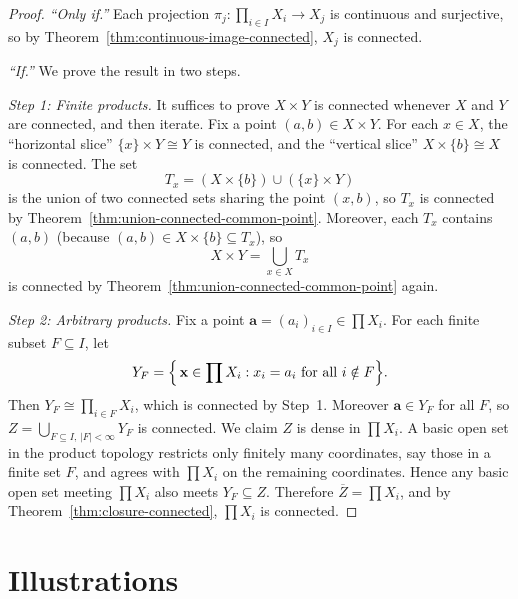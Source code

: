 \documentclass[11pt,a4paper,twoside]{book}
\theoremstyle{remark}
\theoremstyle{definition}
\theoremstyle{definition}
\begin{document}
\begin{proof}
\emph{``Only if.''}\; Each projection
$\pi_j\colon\prod_{i\in I}X_i\to X_j$ is continuous and surjective,
so by Theorem~\ref{thm:continuous-image-connected}, $X_j$ is connected.

\medskip\noindent
\emph{``If.''}\;  We prove the result in two steps.

\emph{Step 1: Finite products.}\;
It suffices to prove $X\times Y$ is connected whenever $X$ and $Y$
are connected, and then iterate.  Fix a point $(a,b)\in X\times Y$.
For each $x\in X$, the ``horizontal slice''
$\{x\}\times Y \cong Y$ is connected, and the ``vertical slice''
$X\times\{b\}\cong X$ is connected.  The set
\[
   T_x = (X\times\{b\})\cup(\{x\}\times Y)
\]
is the union of two connected sets sharing the point $(x,b)$, so
$T_x$ is connected by Theorem~\ref{thm:union-connected-common-point}.
Moreover, each $T_x$ contains $(a,b)$ (because $(a,b)\in X\times\{b\}
\subseteq T_x$), so
\[
   X\times Y = \bigcup_{x\in X}T_x
\]
is connected by Theorem~\ref{thm:union-connected-common-point} again.

\emph{Step 2: Arbitrary products.}\;
Fix a point $\mathbf{a}=(a_i)_{i\in I}\in\prod X_i$.  For each
finite subset $F\subseteq I$, let
\[
   Y_F = \Bigl\{\,\mathbf{x}\in\prod X_i : x_i=a_i
                  \text{ for all }i\notin F\Bigr\}.
\]
Then $Y_F\cong\prod_{i\in F}X_i$, which is connected by Step~1.
Moreover $\mathbf{a}\in Y_F$ for all $F$, so
$Z=\bigcup_{F\subseteq I,\,|F|<\infty}Y_F$ is connected.  We claim
$Z$ is dense in $\prod X_i$.  A basic open set in the product topology
restricts only finitely many coordinates, say those in a finite set $F$,
and agrees with $\prod X_i$ on the remaining coordinates.  Hence any
basic open set meeting $\prod X_i$ also meets $Y_F\subseteq Z$.
Therefore $\overline{Z}=\prod X_i$, and by
Theorem~\ref{thm:closure-connected}, $\prod X_i$ is connected.
\end{proof}

\section{Illustrations}
\end{document}

